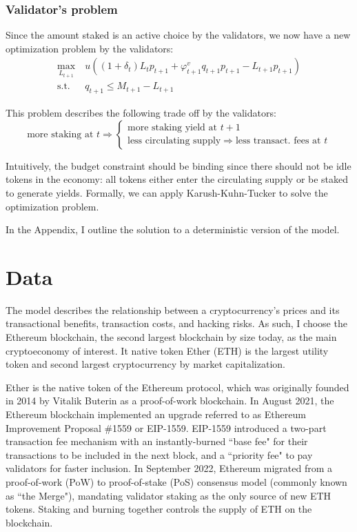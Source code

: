 \documentclass[12pt]{article}
\begin{document}
\subsubsection{Validator's problem}
Since the amount staked is an active choice by the validators, we now have a new optimization problem by the validators:
\begin{align}
\max_{L_{t+1}}\ & u((1+\delta_t) L_t p_{t+1} + \varphi_{t+1}^v q_{t+1} p_{t+1} - L_{t+1}p_{t+1})\\
    \text{s.t. } & q_{t+1} \leq M_{t+1} - L_{t+1} \nonumber
\end{align}

This problem describes the following trade off by the validators:
\[
\text{more staking at } t \Rightarrow
\begin{cases}
    \text{more staking yield at } t+1\\
    \text{less circulating supply} \Rightarrow \text{less transact. fees at } t
\end{cases}
\]

Intuitively, the budget constraint should be binding since there should not be idle tokens in the economy: all tokens either enter the circulating supply or be staked to generate yields. Formally, we can apply Karush-Kuhn-Tucker to solve the optimization problem. 

In the Appendix, I outline the solution to a deterministic version of the model.




\section{Data}
\label{sec:data}
The model describes the relationship between a cryptocurrency's prices and its transactional benefits, transaction costs, and hacking risks. As such, I choose the Ethereum blockchain, the second largest blockchain by size today, as the main cryptoeconomy of interest. It native token Ether (ETH) is the largest utility token and second largest cryptocurrency by market capitalization.

Ether is the native token of the Ethereum protocol, which was originally founded in 2014 by Vitalik Buterin as a proof-of-work blockchain. In August 2021, the Ethereum blockchain implemented an upgrade referred to as Ethereum Improvement Proposal \#1559 or EIP-1559. EIP-1559 introduced a two-part transaction fee mechanism with an instantly-burned ``base fee" for their transactions to be included in the next block, and a ``priority fee" to pay validators for faster inclusion. In September 2022, Ethereum migrated from a proof-of-work (PoW) to proof-of-stake (PoS) consensus model (commonly known as ``the Merge"), mandating validator staking as the only source of new ETH tokens. Staking and burning together controls the supply of ETH on the blockchain.
\end{document}

